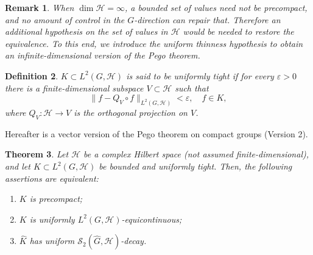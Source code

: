 \documentclass[10pt,a4paper]{amsart}
\newtheorem{theorem}{Theorem}[section]
\newtheorem{definition}[theorem]{Definition}
\newtheorem{remark}[theorem]{Remark}
\begin{document}
\begin{remark}{\rm 
  When $\dim\mathcal{H}=\infty$, a bounded
set of values need not be precompact, and no amount of control in the $G$-direction
can repair that. Therefore an additional hypothesis on the  set of values in $\mathcal{H}$ would be
needed to restore the equivalence. To this end, we introduce the uniform thinness hypothesis to obtain an infinite-dimensional version of the Pego theorem. 
}\end{remark}

\begin{definition}\label{def:tight}
$K\subset L^2(G,\mathcal{H})$ is said to be uniformly tight if for every $\varepsilon>0$ there is a
finite-dimensional subspace $V\subset\mathcal{H}$ such that
$$
\|f - Q_V\circ f\|_{L^2(G,\mathcal{H})}<\varepsilon,\quad f\in K,
$$
where $Q_V:\mathcal{H}\to V$ is the orthogonal projection on $V$.
\end{definition}



Hereafter is a vector version of the Pego theorem on compact groups (Version 2).


\begin{theorem}\label{thm:main-tight}
Let $\mathcal{H}$ be a complex Hilbert space (not assumed finite-dimensional), and let
$K\subset L^2(G,\mathcal{H})$ be bounded and uniformly tight. Then, the following assertions are
equivalent:
\begin{enumerate}
\item[(i)] $K$ is precompact;
\item[(ii)] $K$ is uniformly
$L^2(G,\mathcal{H})$-equicontinuous;
\item[(iii)] $\widehat K$ has uniform $\mathscr{S}_2(\widehat{G},\mathcal{H})$-decay.
\end{enumerate} 
\end{theorem}
\end{document}
